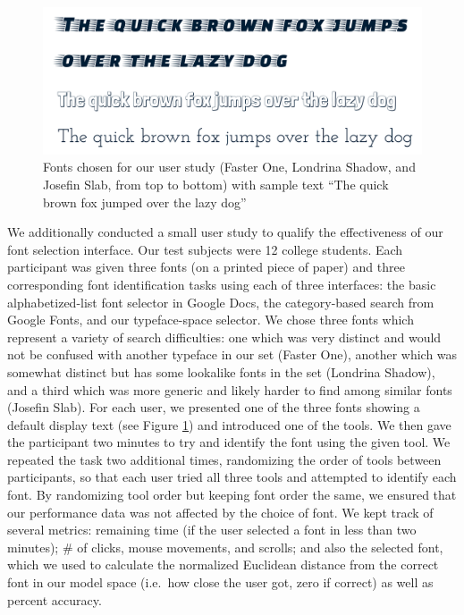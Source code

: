 \begin{figure}[h]
    \centering
    \includegraphics[width=\textwidth]{images/user-fonts.pdf}
    \caption{Fonts chosen for our user study (Faster One, Londrina Shadow, and Josefin Slab, from top to bottom) with sample text ``The quick brown fox jumped over the lazy dog''}
    \label{fig:user-fonts}
\end{figure}

We additionally conducted a small user study to qualify the effectiveness of our font selection interface. Our test subjects were 12 college students. Each participant was given three fonts (on a printed piece of paper) and three corresponding font identification tasks using each of three interfaces: the basic alphabetized-list font selector in Google Docs, the category-based search from Google Fonts, and our typeface-space selector. We chose three fonts which represent a variety of search difficulties: one which was very distinct and would not be confused with another typeface in our set (Faster One), another which was somewhat distinct but has some lookalike fonts in the set (Londrina Shadow), and a third which was more generic and likely harder to find among similar fonts (Josefin Slab). For each user, we presented one of the three fonts showing a default display text (see Figure \ref{fig:user-fonts}) and introduced one of the tools. We then gave the participant two minutes to try and identify the font using the given tool. We repeated the task two additional times, randomizing the order of tools between participants, so that each user tried all three tools and attempted to identify each font. By randomizing tool order but keeping font order the same, we ensured that our performance data was not affected by the choice of font. We kept track of several metrics: remaining time (if the user selected a font in less than two minutes); \# of clicks, mouse movements, and scrolls; and also the selected font, which we used to calculate the normalized Euclidean distance from the correct font in our model space (i.e.\ how close the user got, zero if correct) as well as percent accuracy.

